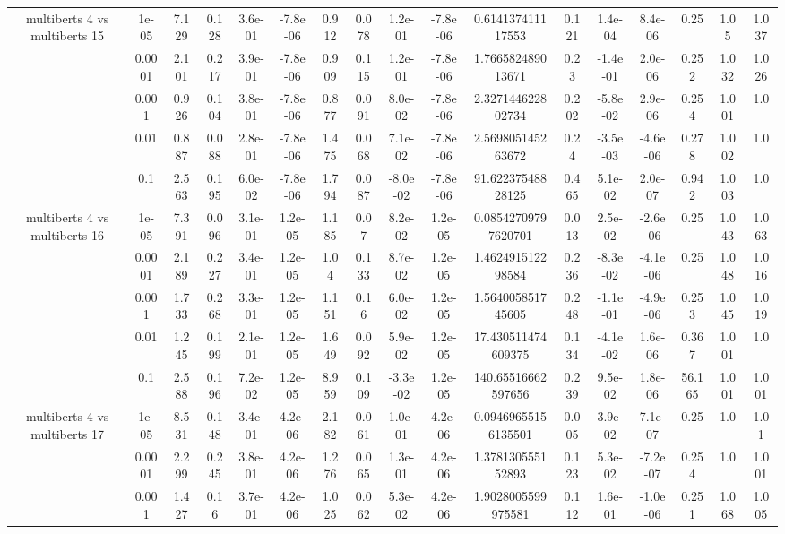 \begin{tabular}{|c|c|c|c|c|c|c|c|c|c|c|c|c|c|c|c|c|}
\hline
\multirow{5}{*}{multiberts 4 vs multiberts 15} & 1e-05 & 7.129 & 0.128 & 3.6e-01 & -7.8e-06 & 0.912 & 0.078 & 1.2e-01 & -7.8e-06 & 0.614137411117553 & 0.121 & 1.4e-04 & 8.4e-06 & 0.25 & 1.05 & 1.037 \\
 & 0.0001 & 2.101 & 0.217 & 3.9e-01 & -7.8e-06 & 0.909 & 0.115 & 1.2e-01 & -7.8e-06 & 1.766582489013671 & 0.23 & -1.4e-01 & 2.0e-06 & 0.252 & 1.032 & 1.026 \\
 & 0.001 & 0.926 & 0.104 & 3.8e-01 & -7.8e-06 & 0.877 & 0.091 & 8.0e-02 & -7.8e-06 & 2.327144622802734 & 0.202 & -5.8e-02 & 2.9e-06 & 0.254 & 1.001 & 1.0 \\
 & 0.01 & 0.887 & 0.088 & 2.8e-01 & -7.8e-06 & 1.475 & 0.068 & 7.1e-02 & -7.8e-06 & 2.569805145263672 & 0.24 & -3.5e-03 & -4.6e-06 & 0.278 & 1.002 & 1.0 \\
 & 0.1 & 2.563 & 0.195 & 6.0e-02 & -7.8e-06 & 1.794 & 0.087 & -8.0e-02 & -7.8e-06 & 91.62237548828125 & 0.465 & 5.1e-02 & 2.0e-07 & 0.942 & 1.003 & 1.0 \\
\hline
\multirow{5}{*}{multiberts 4 vs multiberts 16} & 1e-05 & 7.391 & 0.096 & 3.1e-01 & 1.2e-05 & 1.185 & 0.07 & 8.2e-02 & 1.2e-05 & 0.08542709797620701 & 0.013 & 2.5e-02 & -2.6e-06 & 0.25 & 1.043 & 1.063 \\
 & 0.0001 & 2.189 & 0.227 & 3.4e-01 & 1.2e-05 & 1.04 & 0.133 & 8.7e-02 & 1.2e-05 & 1.462491512298584 & 0.236 & -8.3e-02 & -4.1e-06 & 0.25 & 1.048 & 1.016 \\
 & 0.001 & 1.733 & 0.268 & 3.3e-01 & 1.2e-05 & 1.151 & 0.16 & 6.0e-02 & 1.2e-05 & 1.564005851745605 & 0.248 & -1.1e-01 & -4.9e-06 & 0.253 & 1.045 & 1.019 \\
 & 0.01 & 1.245 & 0.199 & 2.1e-01 & 1.2e-05 & 1.649 & 0.092 & 5.9e-02 & 1.2e-05 & 17.430511474609375 & 0.134 & -4.1e-02 & 1.6e-06 & 0.367 & 1.001 & 1.0 \\
 & 0.1 & 2.588 & 0.196 & 7.2e-02 & 1.2e-05 & 8.959 & 0.109 & -3.3e-02 & 1.2e-05 & 140.65516662597656 & 0.239 & 9.5e-02 & 1.8e-06 & 56.165 & 1.001 & 1.001 \\
\hline
\multirow{5}{*}{multiberts 4 vs multiberts 17} & 1e-05 & 8.531 & 0.148 & 3.4e-01 & 4.2e-06 & 2.182 & 0.061 & 1.0e-01 & 4.2e-06 & 0.09469655156135501 & 0.005 & 3.9e-02 & 7.1e-07 & 0.25 & 1.0 & 1.01 \\
 & 0.0001 & 2.299 & 0.245 & 3.8e-01 & 4.2e-06 & 1.276 & 0.065 & 1.3e-01 & 4.2e-06 & 1.378130555152893 & 0.123 & 5.3e-02 & -7.2e-07 & 0.254 & 1.0 & 1.001 \\
 & 0.001 & 1.427 & 0.16 & 3.7e-01 & 4.2e-06 & 1.025 & 0.062 & 5.3e-02 & 4.2e-06 & 1.9028005599975581 & 0.112 & 1.6e-01 & -1.0e-06 & 0.251 & 1.068 & 1.005 \\

\end{tabular}
